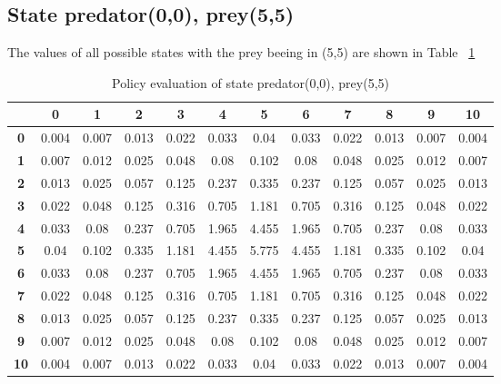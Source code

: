 \documentclass[11pt]{article}
\begin{document}
\subsection{State predator(0,0), prey(5,5)}

The values of all possible states with the prey beeing in (5,5) are shown in Table ~\ref{state1}

\begin{center}
\begin{table}[ht]
{\small
\hfill{}
\begin{tabular}{c|c|c|c|c|c|c|c|c|c|c|c}
\textbf{} & \textbf{0} & \textbf{1} & \textbf{2} & \textbf{3} & \textbf{4} & \textbf{5} & \textbf{6} & \textbf{7} & \textbf{8} & \textbf{9} & \textbf{10}\\
	\hline
	\textbf{0} 		& 0.004	& 0.007 & 0.013	& 0.022 & 0.033 & 0.04 & 0.033 & 0.022 & 0.013 & 0.007 & 0.004\\
	\textbf{1} 		& 0.007 & 0.012 & 0.025 & 0.048 & 0.08 & 0.102 & 0.08 & 0.048 & 0.025 & 0.012 & 0.007\\
\textbf{2} & 0.013	& 0.025	& 0.057	& 0.125	& 0.237	& 0.335	& 0.237	& 0.125	& 0.057	& 0.025	& 0.013	\\
\textbf{3} & 0.022	& 0.048	& 0.125	& 0.316	& 0.705	& 1.181	& 0.705	& 0.316	& 0.125	& 0.048	& 0.022	\\
\textbf{4} & 0.033	& 0.08	& 0.237	& 0.705	& 1.965	& 4.455	& 1.965	& 0.705	& 0.237	& 0.08	& 0.033	\\
\textbf{5} & 0.04	& 0.102	& 0.335	& 1.181	& 4.455	& 5.775	& 4.455	& 1.181	& 0.335	& 0.102	& 0.04	\\
\textbf{6} & 0.033	& 0.08	& 0.237	& 0.705	& 1.965	& 4.455	& 1.965	& 0.705	& 0.237	& 0.08	& 0.033	\\
\textbf{7} & 0.022	& 0.048	& 0.125	& 0.316	& 0.705	& 1.181	& 0.705	& 0.316	& 0.125	& 0.048	& 0.022	\\
\textbf{8} & 0.013	& 0.025	& 0.057	& 0.125	& 0.237	& 0.335	& 0.237	& 0.125	& 0.057	& 0.025	& 0.013	\\
\textbf{9} & 0.007	& 0.012	& 0.025	& 0.048	& 0.08	& 0.102	& 0.08	& 0.048	& 0.025	& 0.012	& 0.007	\\
\textbf{10} & 0.004	& 0.007	& 0.013	& 0.022	& 0.033	& 0.04	& 0.033	& 0.022	& 0.013	& 0.007	& 0.004	\\	
\end{tabular}}
\hfill{}
\caption{Policy evaluation of state predator(0,0), prey(5,5)}
\label{state1}
\end{table}
\end{center}
\end{document}

